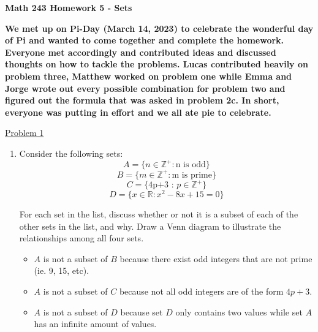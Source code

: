 \documentclass{article}
\newcommand{\R}{\mathbb{R}}
\newcommand{\Z}{\mathbb{Z}}
\begin{document}
\noindent\textbf{Math 243 \hfill Homework 5 - Sets}

\textbf{We met up on Pi-Day (March 14, 2023) to celebrate 
the wonderful day of Pi and wanted to come together and 
complete the homework. Everyone met accordingly and 
contributed ideas and discussed thoughts on how to tackle 
the problems. Lucas contributed heavily on problem three, 
Matthew worked on problem one while Emma and Jorge wrote 
out every possible combination for problem two and figured 
out the formula that was asked in problem 2c. In short, 
everyone was putting in effort and we all ate pie to 
celebrate.} 

\pagebreak 

\underline{Problem 1}

\begin{enumerate}
    \item Consider the following sets:
$$A = \{n \in \Z^+ : \text{n is odd}\}$$
$$B = \{m\in\Z^+:\text{m is prime}\}$$
$$C = \{\text{4p+3 : }p\in\Z^+\}$$
$$D = \{x\in\R: x^2-8x+15=0 \}$$

For each set in the list, discuss whether or not it is a subset of 
each of the other sets in the list, and why. Draw a Venn diagram to 
illustrate the relationships among all four sets.
\centering

\begin{itemize}
    \item $A$ is not a subset of $B$ because there exist odd integers 
    that are not prime (ie. 9, 15, etc).
    \item $A$ is not a subset of $C$ because not all odd integers are 
    of the form $4p + 3$.
    \item $A$ is not a subset of $D$ because set $D$ only contains two values while set $A$ has an
    infinite amount of values.
    
\end{itemize}

\end{enumerate}
\end{document}
